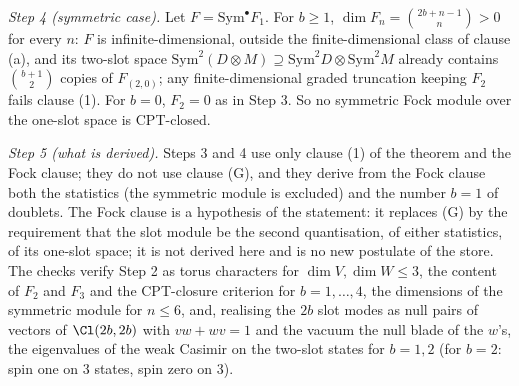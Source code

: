 \emph{Step 4 (symmetric case).} Let $F = \mathrm{Sym}^{\bullet}F_{1}$. For $b \ge 1$, $\dim F_{n} = \binom{2b + n - 1}{n} > 0$ for every $n$: $F$ is infinite-dimensional, outside the finite-dimensional class of clause (a), and its two-slot space $\mathrm{Sym}^{2}(D \otimes M) \supseteq \mathrm{Sym}^{2}D \otimes \mathrm{Sym}^{2}M$ already contains $\binom{b+1}{2}$ copies of $F_{(2,0)}$; any finite-dimensional graded truncation keeping $F_{2}$ fails clause (1). For $b = 0$, $F_{2} = 0$ as in Step 3. So no symmetric Fock module over the one-slot space is CPT-closed.

\emph{Step 5 (what is derived).} Steps 3 and 4 use only clause (1) of the theorem and the Fock clause; they do not use clause (G), and they derive from the Fock clause both the statistics (the symmetric module is excluded) and the number $b = 1$ of doublets. The Fock clause is a hypothesis of the statement: it replaces (G) by the requirement that the slot module be the second quantisation, of either statistics, of its one-slot space; it is not derived here and is no new postulate of the store. The checks verify Step 2 as torus characters for $\dim V, \dim W \le 3$, the content of $F_{2}$ and $F_{3}$ and the CPT-closure criterion for $b = 1, \dots, 4$, the dimensions of the symmetric module for $n \le 6$, and, realising the $2b$ slot modes as null pairs of vectors of $\Cl(2b, 2b)$ with $vw + wv = 1$ and the vacuum the null blade of the $w$'s, the eigenvalues of the weak Casimir on the two-slot states for $b = 1, 2$ (for $b = 2$: spin one on $3$ states, spin zero on $3$).
